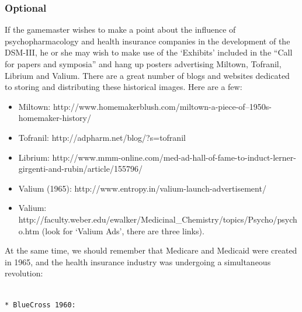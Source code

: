 \subsubsection{Optional}
\label{optional}

If the gamemaster wishes to make a point about the influence of psychopharmacology and health insurance companies in the development of the DSM-III, he or she may wish to make use of the `Exhibits' included in the ``Call for papers and symposia'' and hang up posters advertising Miltown, Tofranil, Librium and Valium. There are a great number of blogs and websites dedicated to storing and distributing these historical images. Here are a few:

\begin{itemize}
\item Miltown: http:\slash \slash www.homemakerblush.com\slash miltown-a-piece-of--1950s-homemaker-history\slash 

\item Tofranil: http:\slash \slash adpharm.net\slash blog\slash ?s=tofranil

\item Librium: http:\slash \slash www.mmm-online.com\slash med-ad-hall-of-fame-to-induct-lerner-girgenti-and-rubin\slash article\slash 155796\slash 

\item Valium (1965): http:\slash \slash www.entropy.in\slash valium-launch-advertisement\slash  

\item Valium: http:\slash \slash faculty.weber.edu\slash ewalker\slash Medicinal\_Chemistry\slash topics\slash Psycho\slash psycho.htm (look for `Valium Ads', there are three links).

\end{itemize}

At the same time, we should remember that Medicare and Medicaid were created in 1965, and the health insurance industry was undergoing a simultaneous revolution: 

\begin{adjustwidth}{2.5em}{2.5em}
\begin{verbatim}

* BlueCross 1960: 

\end{verbatim}
\end{adjustwidth}

